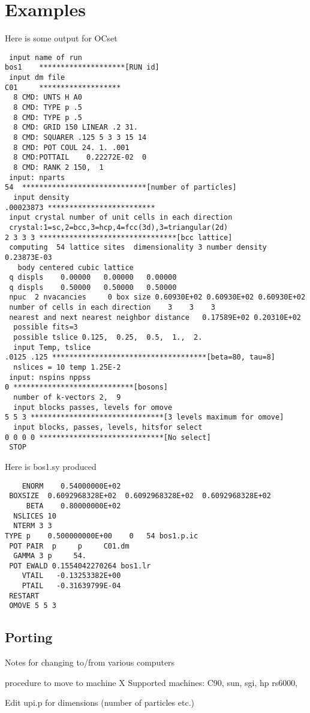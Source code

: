\section{Examples}
Here is some output for OCset
\begin{verbatim}
 input name of run
bos1    ********************[RUN id]
 input dm file 
C01     *******************
  8 CMD: UNTS H A0
  8 CMD: TYPE p .5
  8 CMD: TYPE p .5
  8 CMD: GRID 150 LINEAR .2 31.
  8 CMD: SQUARER .125 5 3 3 15 14
  8 CMD: POT COUL 24. 1. .001
  8 CMD:POTTAIL    0.22272E-02  0
  8 CMD: RANK 2 150,  1
 input: nparts 
54  *****************************[number of particles]
  input density 
.00023873 *************************
 input crystal number of unit cells in each direction
 crystal:1=sc,2=bcc,3=hcp,4=fcc(3d),3=triangular(2d)
2 3 3 3 ********************************[bcc lattice]
 computing  54 lattice sites  dimensionality 3 number density  0.23873E-03
   body centered cubic lattice
 q displs    0.00000   0.00000   0.00000
 q displs    0.50000   0.50000   0.50000
 npuc  2 nvacancies     0 box size 0.60930E+02 0.60930E+02 0.60930E+02
 number of cells in each direction    3    3    3
 nearest and next nearest neighbor distance   0.17589E+02 0.20310E+02
  possible fits=3
  possible tslice 0.125,  0.25,  0.5,  1.,  2.
  input Temp, tslice 
.0125 .125 ************************************[beta=80, tau=8]
  nslices = 10 temp 1.25E-2
 input: nspins nppss 
0 ****************************[bosons]
  number of k-vectors 2,  9
  input blocks passes, levels for omove 
5 5 3 *******************************[3 levels maximum for omove]
  input blocks, passes, levels, hitsfor select 
0 0 0 0 *****************************[No select]
 STOP 
\end{verbatim}
Here is bos1.sy produced
\begin{verbatim}
    ENORM    0.54000000E+02
 BOXSIZE  0.6092968328E+02  0.6092968328E+02  0.6092968328E+02
     BETA    0.80000000E+02
  NSLICES 10
  NTERM 3 3
TYPE p    0.500000000E+00    0   54 bos1.p.ic     
 POT PAIR  p     p     C01.dm
  GAMMA 3 p     54.
 POT EWALD 0.1554042270264 bos1.lr
    VTAIL   -0.13253382E+00
    PTAIL   -0.31639799E-04
 RESTART
 OMOVE 5 5 3

\end{verbatim}
 
\subsection{Porting}
    Notes for changing to/from various computers

    procedure to move to machine X
Supported machines: C90, sun, sgi, hp rs6000, 



  Edit upi.p for dimensions (number of particles etc.)



